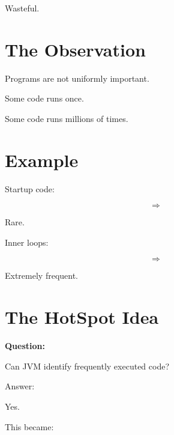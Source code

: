 \documentclass[11pt,a4paper]{book}
\begin{document}
Wasteful.


\section{The Observation}

Programs are not uniformly important.


Some code runs once.


Some code runs millions of times.


\section{Example}

Startup code:

\[
\Rightarrow
\]

Rare.


Inner loops:

\[
\Rightarrow
\]

Extremely frequent.


\section{The HotSpot Idea}

\textbf{Question:}


Can JVM identify frequently
executed code?


Answer:


Yes.


This became:

\end{document}
